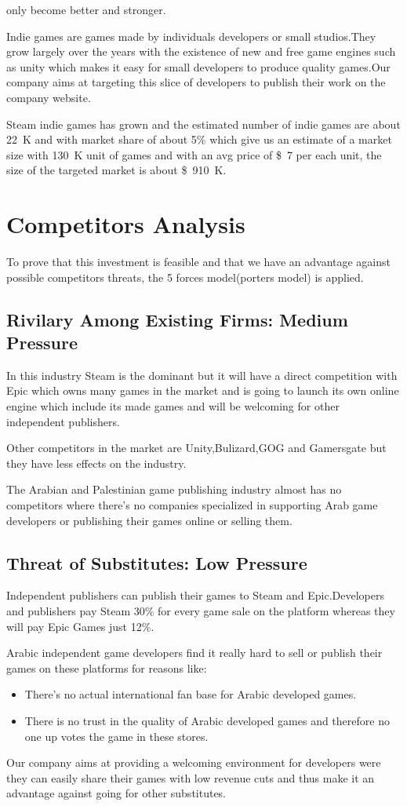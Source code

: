 \documentclass[fontsize=14pt,svgnames]{scrreprt}
\begin{document}
only become better and stronger.
\par Indie games are games made by individuals developers or small studios.They grow largely over the years with the existence of new and free game engines such as unity which makes it easy for small developers to produce quality games.Our company aims at targeting this slice of developers to publish their work on the company website.
\par Steam indie games has grown and the estimated number of indie games are about \SI{22}[]{K} and with market share of about 5\% which give us an estimate of a market size with \SI{130}[]{K} unit of games and with an avg price of \SI{7}[\$]{} per each unit, the size of the targeted market is about \SI{910}[\$]{K}.

\section{Competitors Analysis}
To prove that this investment is feasible and that we have an advantage against
possible competitors threats, the 5 forces model(porters model) is applied.
\subsection{Rivilary Among Existing Firms: Medium Pressure}
In this industry Steam is the dominant but it will have a direct competition with Epic which owns many games in the market and is going to launch its own online engine which include its made games and will be welcoming for other independent publishers.
\par Other competitors in the market are Unity,Bulizard,GOG and Gamersgate but they have less effects on the industry.
\par The Arabian and Palestinian game publishing industry  almost has no competitors 
where there's no companies  specialized in supporting Arab game developers or publishing their games online or selling them.
\subsection{Threat of Substitutes: Low Pressure}
Independent publishers can publish their games to Steam and Epic.Developers and publishers pay Steam 30\% for every game sale on the platform whereas they will pay Epic Games just 12\%.
\par Arabic independent game developers find it really hard to sell or publish their games on these platforms for reasons like:
\begin{itemize}
\item There's no actual  international fan base for Arabic developed games. 
\item There is no trust in the quality of Arabic developed games and therefore no one up votes the game in these stores. 
\end{itemize}
\par Our company aims at providing a welcoming environment for developers were they can easily share their games with low revenue cuts and thus make it an advantage against going for other substitutes.
\end{document}
